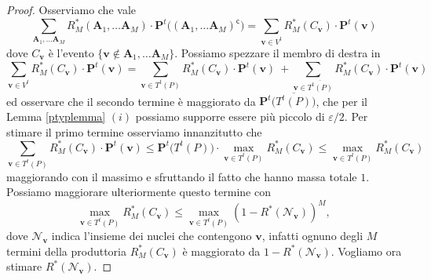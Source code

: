 \begin{proof}
  Osserviamo che vale
  \[\sum_{\mathbf{A}_{1},\dots\mathbf{A}_{M}} R_{M}^{*}(\mathbf{A}_{1},\dots\mathbf{A}_{M})\cdot\mathbf{P}^t\big((\mathbf{A}_{1},\dots\mathbf{A}_{M})^{\mathsf{c}}\big)=\sum_{\mathbf{v}\in V^{t}} R_{M}^{*}(C_{\mathbf{v}})\cdot \mathbf{P}^t(\mathbf{v})\]
  dove \(C_{\mathbf{v}}\) è l'evento \(\{\mathbf{v}\not\in \mathbf{A}_{1},\dots\mathbf{A}_{M}\}\). Possiamo spezzare il membro di destra in 
  \begin{equation}
    \label{eq:objective} \sum_{\mathbf{v}\in V^{t}} R_{M}^{*}(C_{\mathbf{v}})\cdot \mathbf{P}^t(\mathbf{v}) = \sum_{\mathbf{v}\in T^{t}(P)} R_{M}^{*}(C_{\mathbf{v}})\cdot \mathbf{P}^t(\mathbf{v})\ + \sum_{\mathbf{v}\in \overline{T^{t}(P)}} R_{M}^{*}(C_{\mathbf{v}})\cdot \mathbf{P}^t(\mathbf{v}) 
  \end{equation}
  ed osservare che il secondo termine è maggiorato da \(\mathbf{P}^t\Big(\overline{T^{t}(P)}\Big)\), che per il Lemma \ref{ptyplemma} \((i)\) possiamo supporre essere più piccolo di \(\varepsilon/2\). Per stimare il primo termine osserviamo innanzitutto che
  \[\sum_{\mathbf{v}\in T^t(P)} R_M^{*}(C_{\mathbf{v}})\cdot \mathbf{P}^t(\mathbf{v})\le \mathbf{P}^t\big(T^t(P)\big)\cdot \max_{\mathbf{v}\in T^t(P)} R_{M}^{*}(C_{\mathbf{v}})\le \max_{\mathbf{v}\in T^t(P)} R_{M}^{*}(C_{\mathbf{v}})\]
  maggiorando con il massimo e sfruttando il fatto che hanno massa totale \(1\). Possiamo maggiorare ulteriormente questo termine con
  \[\max_{\mathbf{v}\in T^t(P)} R_{M}^{*}(C_{\mathbf{v}})\le \max_{\mathbf{v}\in T^t(P)} (1-R^{*}(\mathcal{N}_{\mathbf{v}}))^{M},\]
  dove \(\mathcal{N}_{\mathbf{v}}\) indica l'insieme dei nuclei che contengono \(\mathbf{v}\), infatti ognuno degli \(M\) termini della produttoria \(R_{M}^{*}(C_{\mathbf{v}})\) è maggiorato da \(1-R^{*}(\mathcal{N}_{\mathbf{v}})\). Vogliamo ora stimare \(R^{*}(\mathcal{N}_{\mathbf{v}})\).
  

\end{proof}
